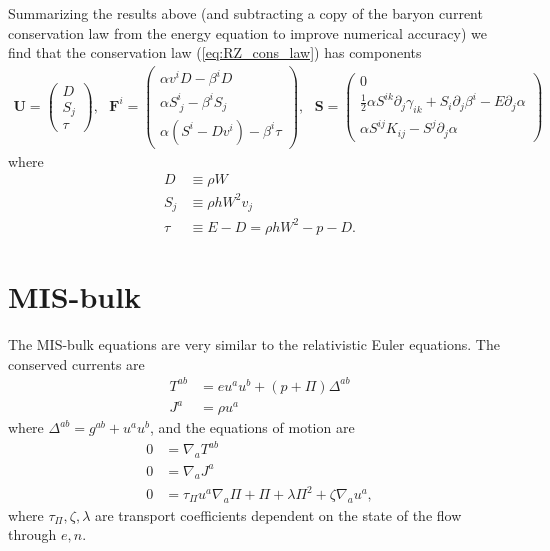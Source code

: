 \documentclass[12pt]{article}
\numberwithin{equation}{section}
\begin{document}
Summarizing the results above (and subtracting a copy of the baryon current conservation law from the energy equation to improve numerical accuracy) we find that the conservation law (\ref{eq:RZ_cons_law}) has components
\begin{equation}
\begin{aligned}
\bm{U} =
\begin{pmatrix}
D \\
S_j \\
\tau
\end{pmatrix},~~~
\bm{F}^i =
\begin{pmatrix}
\alpha v^i D - \beta^i D \\
\alpha S^{i}_{~j} - \beta^i S_j \\
\alpha (S^i - D v^i) - \beta^i \tau
\end{pmatrix},~~~
\bm{S} =
\begin{pmatrix}
0 \\
\frac{1}{2} \alpha S^{ik} \partial_j \gamma_{ik} + S_i \partial_j \beta^i - E \partial_j \alpha \\
\alpha S^{ij} K_{ij} - S^j \partial_j \alpha
\end{pmatrix}
\end{aligned}
\end{equation}
where
\begin{align}
D &\equiv \rho W \\
S_j &\equiv \rho h W^2 v_j \\
\tau &\equiv E - D = \rho h W^2 - p - D.
\end{align}

\section{MIS-bulk}

The MIS-bulk equations \cite{Bemfica19} are very similar to the relativistic Euler equations.
The conserved currents are
\begin{align}
T^{ab} &= e u^a u^b + (p + \Pi) \Delta^{ab} \\
J^{a} &= \rho u^a
\end{align}
where $\Delta^{ab} = g^{ab} + u^a u^b$, and the equations of motion are
\begin{align}
0 &= \nabla_{a} T^{ab} \\
0 &= \nabla_{a} J^{a} \\
0 &= \tau_{\Pi} u^a \nabla_a \Pi + \Pi + \lambda \Pi^2 + \zeta \nabla_a u^a, \label{eq:bulk_eq}
\end{align}
where $\tau_{\Pi}, \zeta, \lambda$ are transport coefficients dependent on the state of the flow through $e, n$.
\end{document}
